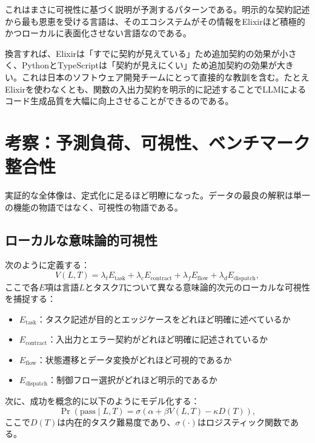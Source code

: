 \documentclass[11pt]{article}
\newcommand{\elixir}{Elixir}
\begin{document}
これはまさに可視性に基づく説明が予測するパターンである。明示的な契約記述から最も恩恵を受ける言語は、そのエコシステムがその情報を\elixir{}ほど積極的かつローカルに表面化させない言語なのである。

換言すれば、Elixirは「すでに契約が見えている」ため追加契約の効果が小さく、PythonとTypeScriptは「契約が見えにくい」ため追加契約の効果が大きい。これは日本のソフトウェア開発チームにとって直接的な教訓を含む。たとえElixirを使わなくとも、関数の入出力契約を明示的に記述することでLLMによるコード生成品質を大幅に向上させることができるのである。

\section{考察：予測負荷、可視性、ベンチマーク整合性}

実証的な全体像は、定式化に足るほど明瞭になった。データの最良の解釈は単一の機能の物語ではなく、可視性の物語である。

\subsection{ローカルな意味論的可視性}

次のように定義する：
\begin{equation}
V(L,T) = \lambda_t E_{\mathrm{task}} + \lambda_c E_{\mathrm{contract}} + \lambda_f E_{\mathrm{flow}} + \lambda_d E_{\mathrm{dispatch}},
\label{eq:visibility}
\end{equation}
ここで各$E$項は言語$L$とタスク$T$について異なる意味論的次元のローカルな可視性を捕捉する：
\begin{itemize}
  \item $E_{\mathrm{task}}$：タスク記述が目的とエッジケースをどれほど明確に述べているか
  \item $E_{\mathrm{contract}}$：入出力とエラー契約がどれほど明確に記述されているか
  \item $E_{\mathrm{flow}}$：状態遷移とデータ変換がどれほど可視的であるか
  \item $E_{\mathrm{dispatch}}$：制御フロー選択がどれほど明示的であるか
\end{itemize}

次に、成功を概念的に以下のようにモデル化する：
\begin{equation}
\Pr(\mathrm{pass} \mid L,T) = \sigma\!\left(\alpha + \beta V(L,T) - \kappa D(T)\right),
\label{eq:logistic}
\end{equation}
ここで$D(T)$は内在的タスク難易度であり、$\sigma(\cdot)$はロジスティック関数である。
\end{document}
